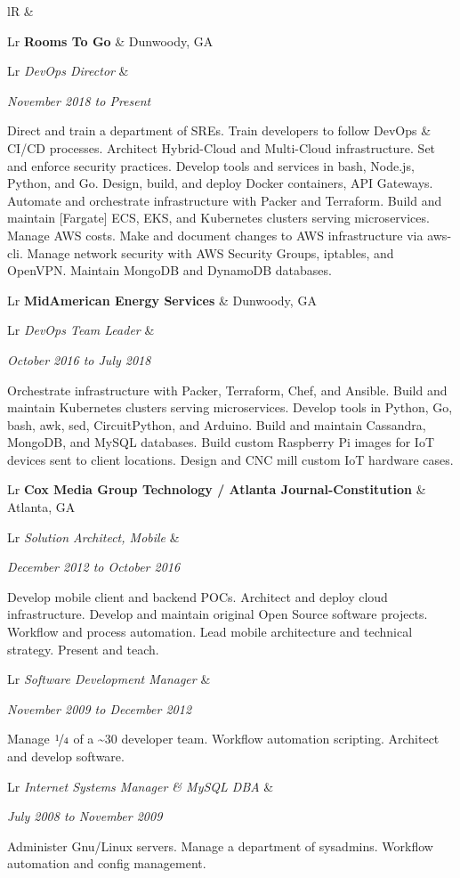 \documentclass[letterpaper,10pt]{article}
\newcommand{\sizeF}[0]{\fontsize{11pt}{13pt}\selectfont}
\newcounter{skipfirstcounter}
\newcommand{\skipfirst}[1]{
    \ifthenelse{\equal{\value{skipfirstcounter}}{0}}{#1}{#1}
    \addtocounter{skipfirstcounter}{1}
}
\newcommand{\blocktitle}[1]{
    \setcounter{skipfirstcounter}{0}
    \begin{tabularx}{\textwidth}{lR}
        {\sizeF\sc{#1}} & \noindent\hrulefill\\
    \end{tabularx}
}
\newcommand{\blockExperience}[1]{
    \blocktitle{Career}%
    #1%
    \vspace{2mm}%
}
\newcommand{\sectionheaderfirst}[2]{
    \begin{tabularx}{\textwidth}{Lr}%
    \textbf{#1} & #2\\%
    \end{tabularx}%
}
\newcommand{\sectionheader}[2]{
    \vspace{2mm}%
    \sectionheaderfirst{#1}{#2}%
}
\newcommand{\sectionsub}[2]{
    {\def\arraystretch{1}
        \begin{tabularx}{\textwidth}{Lr}
        \rowcolor[rgb]{.9,.9,.9}
        \emph{#1} &
        \rule{0mm}{3.2mm} %
        \emph{#2} \\
        \addlinespace[0.4mm]
        \end{tabularx}
    }
}
\newcommand{\sectionbody}[1]{
    #1
    \vspace{1mm}
}
\begin{document}
\blockExperience{
    \sectionheaderfirst
    {Rooms To Go}{Dunwoody, GA}
    \sectionsub
    {DevOps Director}
    {November 2018 to Present}
    \sectionbody{
    Direct and train a department of SREs.
    Train developers to follow DevOps & CI/CD processes.
    Architect Hybrid-Cloud and Multi-Cloud infrastructure.
    Set and enforce security practices.
    Develop tools and services in bash, Node.js, Python, and Go.
    Design, build, and deploy Docker containers, API Gateways.
    Automate and orchestrate infrastructure with Packer and Terraform.
    Build and maintain [Fargate] ECS, EKS, and Kubernetes clusters serving microservices.
    Manage AWS costs.
    Make and document changes to AWS infrastructure via aws-cli.
    Manage network security with AWS Security Groups, iptables, and OpenVPN.
    Maintain MongoDB and DynamoDB databases.
    }

    \sectionheader
    {MidAmerican Energy Services}{Dunwoody, GA}
    \sectionsub
    {DevOps Team Leader}
    {October 2016 to July 2018}
    \sectionbody{
    Orchestrate infrastructure with Packer, Terraform, Chef, and Ansible.
    Build and maintain Kubernetes clusters serving microservices.
    Develop tools in Python, Go, bash, awk, sed, CircuitPython, and Arduino.
    Build and maintain Cassandra, MongoDB, and MySQL databases.
    Build custom Raspberry Pi images for IoT devices sent to client locations.
    Design and CNC mill custom IoT hardware cases.
    }

    \sectionheader
    {Cox Media Group Technology / Atlanta Journal-Constitution}{Atlanta, GA}
    \sectionsub
    {Solution Architect, Mobile}
    {December 2012 to October 2016}
    \sectionbody{
    Develop mobile client and backend POCs.
    Architect and deploy cloud infrastructure.
    Develop and maintain original Open Source software projects.
    Workflow and process automation.
    Lead mobile architecture and technical strategy.
    Present and teach.
    }

    \sectionsub
    {Software Development Manager}
    {November 2009 to December 2012}
    \sectionbody{
    Manage $\nicefrac{1}{4}$ of a \~{}30 developer team.
    Workflow automation scripting.
    Architect and develop software.
    }

    \sectionsub
    {Internet Systems Manager \& MySQL DBA}
    {July 2008 to November 2009}
    \sectionbody{
    Administer Gnu/Linux servers.
    Manage a department of sysadmins.
    Workflow automation and config management.
    }

}
\end{document}
